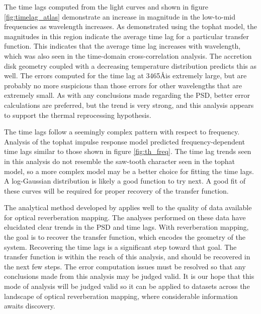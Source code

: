 \documentclass[11pt,letterpaper]{article}
\begin{document}
The time lags computed from the light curves and shown in figure \ref{fig:timelag_atlas} demonstrate an increase in magnitude in the low-to-mid frequencies as wavelength increases. As demonstrated using the tophat model, the magnitudes in this region indicate the average time lag for a particular transfer function. This indicates that the average time lag increases with wavelength, which was also seen in the time-domain cross-correlation analysis. The accretion disk geometry coupled with a decreasing temperature distribution predicts this as well. The errors computed for the time lag at 3465\AA is extremely large, but are probably no more suspicious than those errors for other wavelengths that are extremely small. As with any conclusions made regarding the PSD, better error calculations are preferred, but the trend is very strong, and this analysis appears to support the thermal reprocessing hypothesis.

The time lags follow a seemingly complex pattern with respect to frequency. Analysis of the tophat impulse response model predicted frequency-dependent time lags similar to those shown in figure \ref{fig:th_freq}. The time lag trends seen in this analysis do not resemble the saw-tooth character seen in the tophat model, so a more complex model may be a better choice for fitting the time lags. A log-Gaussian distribution is likely a good function to try next. A good fit of these curves will be required for proper recovery of the transfer function.

The analytical method developed by \cite{2013ApJ...777...24Z} applies well to the quality of data available for optical reverberation mapping. The analyses performed on these data have elucidated clear trends in the PSD and time lags. With reverberation mapping, the goal is to recover the transfer function, which encodes the geometry of the system. Recovering the time lags is a significant step toward that goal. The transfer function is within the reach of this analysis, and should be recovered in the next few steps. The error computation issues must be resolved so that any conclusions made from this analysis may be judged valid. It is our hope that this mode of analysis will be judged valid so it can be applied to datasets across the landscape of optical reverberation mapping, where considerable information awaits discovery.

\newcommand{\mnras}{MNRAS}
\newcommand{\apj}{ApJ}
\newcommand{\aapr}{A\&ARv}
\newcommand{\aap}{A\&A}
\newcommand{\nat}{Nature}
\newcommand{\pasp}{PASP}
\newcommand{\araa}{ARAA}
\newcommand{\ssr}{SSRv}


{}
\end{document}
